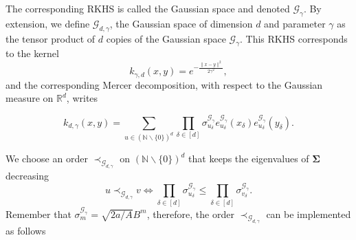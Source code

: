 \documentclass[twoside,11pt]{book}
\numberwithin{theorem}{chapter}
\numberwithin{definition}{chapter}
\numberwithin{proposition}{chapter}
\numberwithin{corollary}{chapter}
\numberwithin{example}{chapter}
\numberwithin{lemma}{chapter}
\numberwithin{assumption}{chapter}
\numberwithin{equation}{chapter}
\numberwithin{figure}{chapter}
\begin{document}
The corresponding RKHS is called the Gaussian space and denoted $\mathcal{G}_{\gamma}$. By extension, we define $\mathcal{G}_{d,\gamma}$, the Gaussian space of dimension $d$  and parameter $\gamma$  as the tensor product of $d$ copies of the Gaussian space $\mathcal{G}_{\gamma}$. This RKHS corresponds to the kernel
\begin{equation}
k_{\gamma,d}(x,y) = e^{-\frac{\|x-y\|^{2}}{2\gamma^{2}}},
\end{equation}
and the corresponding Mercer decomposition, with respect to the Gaussian measure on $\mathbb{R}^{d}$, writes



\begin{equation}
k_{d,\gamma}(x,y) = \sum\limits_{u \in (\mathbb{N}\smallsetminus \{0\})^{d}} \prod\limits_{\delta \in [d]} \sigma_{u_{\delta}}^{\mathcal{G}_{\gamma}} e_{u_{\delta}}^{\mathcal{G}_{\gamma}}(x_{\delta}) e_{u_{\delta}}^{\mathcal{G}_{\gamma}}(y_{\delta}).
\end{equation}











We choose an order $\prec_{\mathcal{G}_{d,\gamma}}$ on $(\mathbb{N}\smallsetminus \{0\})^{d}$ that keeps the eigenvalues of $\bm{\Sigma}$ decreasing
\begin{equation}
u \prec_{\mathcal{G}_{d,\gamma}} v \iff  \prod\limits_{\delta \in [d]} \sigma^{\mathcal{G}_{\gamma}}_{u_{\delta}} \leq \prod\limits_{\delta \in [d]} \sigma^{\mathcal{G}_{\gamma}}_{v_{\delta}}.
\end{equation}
Remember that  $\sigma_{m}^{\mathcal{G}_{\gamma}} = \sqrt{2a/A} B^{m}$, therefore, the order $\prec_{\mathcal{G}_{d,\gamma}}$ can be implemented as follows  
\end{document}
